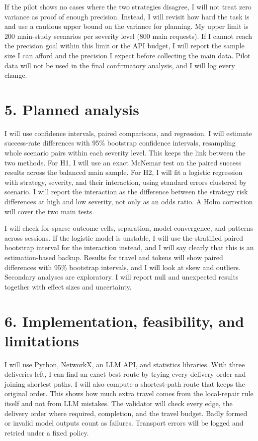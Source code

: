 \documentclass[10.5pt]{article}
\begin{document}
If the pilot shows no cases where the two strategies disagree, I will not treat zero variance as proof of enough precision. Instead, I will revisit how hard the task is and use a cautious upper bound on the variance for planning. My upper limit is 200 main-study scenarios per severity level (800 main requests). If I cannot reach the precision goal within this limit or the API budget, I will report the sample size I can afford and the precision I expect before collecting the main data. Pilot data will not be used in the final confirmatory analysis, and I will log every change.

\section*{5. Planned analysis}
I will use confidence intervals, paired comparisons, and regression. I will estimate success-rate differences with 95\% bootstrap confidence intervals, resampling whole scenario pairs within each severity level. This keeps the link between the two methods. For H1, I will use an exact McNemar test on the paired success results across the balanced main sample. For H2, I will fit a logistic regression with strategy, severity, and their interaction, using standard errors clustered by scenario. I will report the interaction as the difference between the strategy risk differences at high and low severity, not only as an odds ratio. A Holm correction will cover the two main tests.

I will check for sparse outcome cells, separation, model convergence, and patterns across sessions. If the logistic model is unstable, I will use the stratified paired bootstrap interval for the interaction instead, and I will say clearly that this is an estimation-based backup. Results for travel and tokens will show paired differences with 95\% bootstrap intervals, and I will look at skew and outliers. Secondary analyses are exploratory. I will report null and unexpected results together with effect sizes and uncertainty.

\section*{6. Implementation, feasibility, and limitations}
I will use Python, NetworkX, an LLM API, and statistics libraries. With three deliveries left, I can find an exact best route by trying every delivery order and joining shortest paths. I will also compute a shortest-path route that keeps the original order. This shows how much extra travel comes from the local-repair rule itself and not from LLM mistakes. The validator will check every edge, the delivery order where required, completion, and the travel budget. Badly formed or invalid model outputs count as failures. Transport errors will be logged and retried under a fixed policy.
\end{document}
